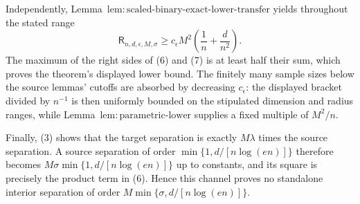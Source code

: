 Independently, Lemma~\(\mathrm{lem:scaled\text{-}binary\text{-}exact\text{-}lower\text{-}transfer}\) yields throughout the stated range
\[
 \mathsf R_{n,d,\epsilon,M,\sigma}
 \ge c_{\epsilon}M^2\left(\frac1n+\frac d{n^2}\right).
\tag{7}
\]
The maximum of the right sides of (6) and (7) is at least half their sum, which proves the theorem's displayed lower bound.  The finitely many sample sizes below the source lemmas' cutoffs are absorbed by decreasing \(c_{\epsilon}\): the displayed bracket divided by \(n^{-1}\) is then uniformly bounded on the stipulated dimension and radius ranges, while Lemma~\(\mathrm{lem:parametric\text{-}lower}\) supplies a fixed multiple of \(M^2/n\).

Finally, (3) shows that the target separation is exactly \(M\lambda\) times the source separation.  A source separation of order \(\min\{1,d/[n\log(en)]\}\) therefore becomes \(M\sigma\min\{1,d/[n\log(en)]\}\) up to constants, and its square is precisely the product term in (6).  Hence this channel proves no standalone interior separation of order \(M\min\{\sigma,d/[n\log(en)]\}\).